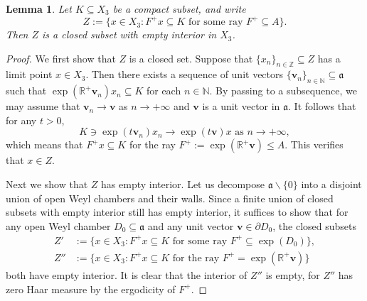 \documentclass[reqno,12pt]{amsart}
\newtheorem{lemma}[theorem]{Lemma}
\theoremstyle{definition}
\numberwithin{equation}{section}
\newcommand{\RR}{\mathbb{R}}
\newcommand{\NN}{\mathbb{N}}
\newcommand{\ZZ}{\mathbb{Z}}
\newcommand{\bv}{\mathbf{v}}
\renewcommand{\setminus}{\smallsetminus}
\begin{document}
{\begin{lemma}\label{L:cpthaus}
    Let $K\subseteq X_3$ be a compact subset, and write $$
    Z:=\{x\in X_3:F^+x\subseteq K\text{ for some ray }F^+\subseteq A\}.
    $$
    Then $Z$ is a closed subset with empty interior in $X_3$.
\end{lemma}
\begin{proof}
We first show that $Z$ is a closed set. Suppose that $\{x_n\}_{n\in\ZZ}\subseteq Z$ has a limit point $x\in X_3$. Then there exists a sequence of unit vectors $\{\bv_n\}_{n\in\NN}\subseteq\mathfrak{a}$ such that $\exp(\RR^+\bv_n)x_n\subseteq K$ for each $n\in\NN$. By passing to a subsequence, we may assume that $\bv_n\to \bv$ as $n\to +\infty$ and $\bv$ is a unit vector in $\mathfrak{a}$. It follows that for any $t>0$, $$
K\ni \exp(t\bv_n)x_n\to \exp(t\bv)x\text{ as }n\to +\infty,
$$
which means that $F^+x\subseteq K$ for the ray $F^+:=\exp(\RR^+\bv)\leq A$. This verifies that $x\in Z$.

Next we show that $Z$ has empty interior. Let us decompose $\mathfrak{a}\setminus\{0\}$ into a disjoint union of open Weyl chambers and their walls. Since a finite union of closed subsets with empty interior still has empty interior, it suffices to show that for any open Weyl chamber $D_0\subseteq\mathfrak{a}$ and any unit vector $\bv\in\partial D_0$, the closed subsets \begin{equation*}
\begin{aligned}
    Z'&:=\{x\in X_3:F^+x\subseteq K\text{ for some ray }F^+\subseteq \exp(D_0)\},\\
    Z''&:=\{x\in X_3:F^+x\subseteq K\text{ for the ray }F^+=\exp(\RR^+\bv)\}
\end{aligned}
\end{equation*}
both have empty interior. It is clear that the interior of $Z''$ is empty, for $Z''$ has zero Haar measure by the ergodicity of $F^+$.


\end{proof}}
\end{document}

